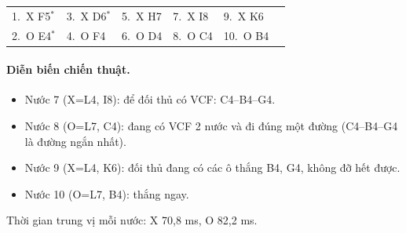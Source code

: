{\footnotesize\linespread{1}\selectfont
\noindent\begin{tabularx}{\linewidth}{*{6}{X}}
\toprule
1.~X F5$^\ast$ & 3.~X D6$^\ast$ & 5.~X H7 & 7.~X I8 & 9.~X K6 &  \\
2.~O E4$^\ast$ & 4.~O F4 & 6.~O D4 & 8.~O C4 & 10.~O B4 &  \\
\bottomrule
\end{tabularx}\par}
\paragraph{Diễn biến chiến thuật.}
\begin{itemize}\footnotesize\linespread{1.1}\selectfont
\setlength{\itemsep}{0pt}
  \item Nước 7 (X=L4, I8): để đối thủ có VCF: C4--B4--G4.
  \item Nước 8 (O=L7, C4): đang có VCF 2 nước và đi đúng một đường (C4--B4--G4 là đường ngắn nhất).
  \item Nước 9 (X=L4, K6): đối thủ đang có các ô thắng B4, G4, không đỡ hết được.
  \item Nước 10 (O=L7, B4): thắng ngay.
\end{itemize}
Thời gian trung vị mỗi nước: X 70,8 ms, O 82,2 ms.
\clearpage

